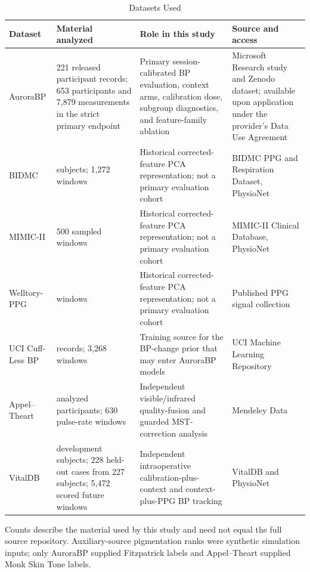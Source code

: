 \documentclass[journal]{IEEEtran}
\begin{document}
\begin{table}[t]
\centering
\caption{Datasets Used}
\label{tab:datasetsummary}
\scriptsize
\renewcommand{\arraystretch}{1.12}
\begin{tabular}{>{\raggedright\arraybackslash}p{2.1cm}>{\raggedright\arraybackslash}p{3.4cm}>{\raggedright\arraybackslash}p{5.0cm}>{\raggedright\arraybackslash}p{5.6cm}}
\toprule
Dataset & Material analyzed & Role in this study & Source and access \\
\midrule
AuroraBP & 1{,}221 released participant records; 653 participants and 7{,}879 measurements in the strict primary endpoint & Primary session-calibrated BP evaluation, context arms, calibration dose, subgroup diagnostics, and feature-family ablation & Microsoft Research study and Zenodo dataset; available upon application under the provider's Data Use Agreement \cite{aurorabp2022,aurorabpDataset} \\
BIDMC & 53 subjects; 1{,}272 windows & Historical corrected-feature PCA representation; not a primary evaluation cohort & BIDMC PPG and Respiration Dataset, PhysioNet \cite{bidmcDataset,pimentel2017,physionet2000} \\
MIMIC-II & 1{,}500 sampled windows & Historical corrected-feature PCA representation; not a primary evaluation cohort & MIMIC-II Clinical Database, PhysioNet \cite{mimicii2011,mimiciiDataset,physionet2000} \\
Welltory-PPG & 106 windows & Historical corrected-feature PCA representation; not a primary evaluation cohort & Published PPG signal collection \cite{welltory2021} \\
UCI Cuff-Less BP & 425 records; 3{,}268 windows & Training source for the BP-change prior that may enter AuroraBP models & UCI Machine Learning Repository \cite{uciCufflessDataset,kachuee2015} \\
Appel--Theart & 108 analyzed participants; 630 pulse-rate windows & Independent visible/infrared quality-fusion and guarded MST-correction analysis & Mendeley Data \cite{appel2025ppg} \\
VitalDB & 55 development subjects; 228 held-out cases from 227 subjects; 5{,}472 scored future windows & Independent intraoperative calibration-plus-context and context-plus-PPG BP tracking & VitalDB and PhysioNet \cite{lee2022vitaldb,vitaldbDataset} \\
\bottomrule
\end{tabular}
\begin{minipage}{0.96\textwidth}
\vspace{2pt}\footnotesize Counts describe the material used by this study and need not equal the full source repository. Auxiliary-source pigmentation ranks were synthetic simulation inputs; only AuroraBP supplied Fitzpatrick labels and Appel--Theart supplied Monk Skin Tone labels.
\end{minipage}
\end{table}
\end{document}
